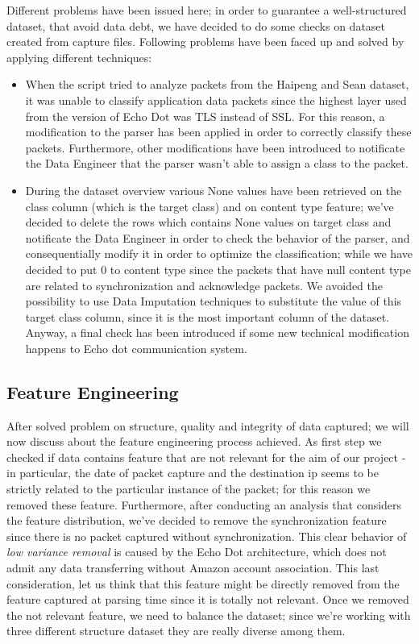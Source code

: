 \documentclass[sigconf]{acmart}
\begin{document}
Different problems have been issued here; in order to guarantee a well-structured dataset, that avoid data debt, we have decided to do some checks on dataset created from capture files.
Following problems have been faced up and solved by applying different techniques:
\begin{itemize}
\item When the script tried to analyze packets from the Haipeng and Sean dataset, it was unable to classify application data packets since the highest layer used from the version of Echo Dot was TLS instead of SSL. For this reason, a modification to the parser has been applied in order to correctly classify these packets. Furthermore, other modifications have been introduced to notificate the Data Engineer that the parser wasn't able to assign a class to the packet.
\item During the dataset overview various None values have been retrieved on the class column (which is the target class) and on content type feature; we've decided to delete the rows which contains None values on target class and notificate the Data Engineer in order to check the behavior of the parser, and consequentially modify it in order to optimize the classification; while we have decided to put 0 to content type since the packets that have null content type are related to synchronization and acknowledge packets. We avoided the possibility to use Data Imputation techniques to substitute the value of this target class column, since it is the most important column of the dataset.
Anyway, a final check has been introduced if some new technical modification happens to Echo dot communication system.
\end{itemize}
\subsection{Feature Engineering}
After solved problem on structure, quality and integrity of data captured; we will now discuss about the feature engineering process achieved. As first step we checked if data contains feature that are not relevant for the aim of our project - in particular, the date of packet capture and the destination ip seems to be strictly related to the particular instance of the packet; for this reason we removed these feature.
Furthermore, after conducting an analysis that considers the feature distribution, we've decided to remove the synchronization feature since there is no packet captured without synchronization. This clear behavior of \textit{low variance removal} is caused by the Echo Dot architecture, which does not admit any data transferring without Amazon account association. This last consideration, let us think that this feature might be directly removed from the feature captured at parsing time since it is totally not relevant.
Once we removed the not relevant feature, we need to balance the dataset; since we're working with three different structure dataset they are really diverse among them.
\end{document}
